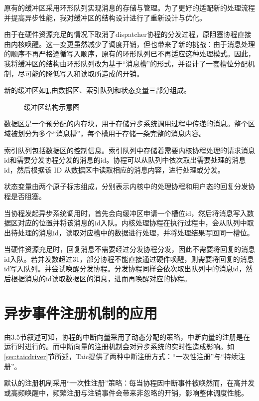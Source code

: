 原有的缓冲区采用环形队列实现消息的存储与管理。为了更好的适配新的处理流程并提高异步性能，我对缓冲区的结构设计进行了重新设计与优化。

由于在硬件资源充足的情况下取消了dispatcher协程的分发过程，原阻塞协程直接由内核唤醒。这一变更虽然减少了调度开销，但也带来了新的挑战：由于消息处理的顺序不再严格遵循写入顺序，原有的环形队列已不再适应这种处理模式。因此，我将缓冲区的结构由环形队列改为基于“消息槽”的形式，并设计了一套槽位分配机制，尽可能的降低写入和读取所造成的开销。

新的缓冲区如\ref{bufferarch},由数据区、索引队列和状态变量三部分组成。

\begin{figure}[htbp]
    \centering
    
    \caption{缓冲区结构示意图}\label{bufferarch}
\end{figure}

数据区是一个预分配的内存块，用于存储异步系统调用过程中传递的消息。整个区域被划分为多个“消息槽”，每个槽用于存储一条完整的消息内容。

索引队列包括数据区的控制信息。索引队列中存储着需要内核协程处理的请求消息id和需要分发协程分发的消息的id。协程可以从队列中依次取出需要处理的消息id，然后根据该 ID 从数据区中读取相应的消息内容，进行处理或分发。

状态变量由两个原子标志组成，分别表示内核中的处理协程和用户态的回复分发协程是否阻塞。

当协程发起异步系统调用时，首先会向缓冲区申请一个槽位id，然后将消息写入数据区对应的位置并将该消息的id入队。内核处理协程在执行过程中，会从队列中取出待处理的消息id，读取对应槽中的数据进行处理，并将处理结果写回同一槽位。

当硬件资源充足时，回复消息不需要经过分发协程分发，因此不需要将回复的消息id入队。若并发数超过31，部分协程不能直接通过硬件唤醒，则需要将回复的消息id写入队列。并尝试唤醒分发协程。分发协程同样会依次取出队列中的消息id，然后根据消息的id读取数据区的消息，进而再唤醒对应的协程。

\section{异步事件注册机制的应用}

由3.5节叙述可知，协程的中断向量采用了动态分配的策略，中断向量的注册是在运行时进行的。而中断向量的注册机制会对异步系统的实时性造成影响。如\ref{sec:taicdriver}节所述，Taic提供了两种中断注册方式：“一次性注册”与“持续注册”。

默认的注册机制采用“一次性注册”策略：每当协程因中断事件被唤然而，在高并发或高频唤醒中，频繁注册与注销事件会带来非忽略的开销，影响整体调度性能。


